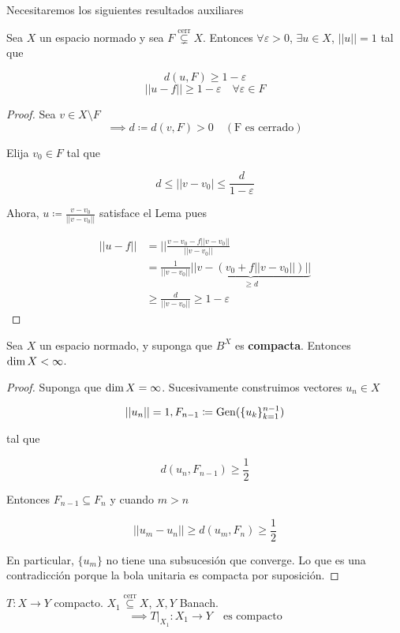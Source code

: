 Necesitaremos los siguientes resultados auxiliares

\begin{flemma}[Riesz]
   Sea $X$ un espacio normado y sea $F\overset{\text{cerr}}{\subsetneq} X$. Entonces $\forall \varepsilon>0$, $\exists u\in X$, $||u||=1$ tal que 

   \[d(u,F)\geq 1-\varepsilon\]
   \[||u-f||\geq 1-\varepsilon\quad \forall \varepsilon\in F\]
\end{flemma}

\begin{proof}
   Sea $v\in X\setminus F$
   \[\implies d\coloneqq d(v,F)>0\quad (\text{F es cerrado})\]

   Elija $v_0\in F$ tal que 

   \[d\leq ||v-v_0|\leq \frac{d}{1-\varepsilon}\]

   Ahora, $u\coloneqq \frac{v-v_0}{||v-v_0||}$ satisface el Lema pues 

   \begin{align*}
      ||u-f||&=||\frac{v-v_0-f||v-v_0||}{||v-v_0||}\\
      &=\frac{1}{||v-v_0||}\underbrace{||v-(v_0+f||v-v_0||)||}_{\geq d}\\
      &\geq \frac{d}{||v-v_0||}\geq 1-\varepsilon
   \end{align*}
\end{proof}

\begin{fcorollary}
   Sea $X$ un espacio normado, y suponga que $B^X$ es \textbf{compacta}. Entonces $\operatorname{dim} X<\infty$.
\end{fcorollary}

\begin{proof}
   Suponga que $\operatorname{dim} X=\infty$. Sucesivamente construimos vectores $u_n\in X$

   \[||u_n||=1,F_{n-1}\coloneqq \operatorname{Gen}(\{u_k\}_{k=1}^{n-1})\]

   tal que 

   \[d(u_n,F_{n-1})\geq \frac{1}{2}\]

   Entonces $F_{n-1}\subseteq F_n$ y cuando $m>n$

   \[||u_m-u_n||\geq d(u_m,F_n)\geq \frac{1}{2}\]

   En particular, $\{u_m\}$ no tiene una subsucesión que converge. Lo que es una contradicción porque la bola unitaria es compacta por suposición.
\end{proof}

\begin{fnote}
   $T:X\to Y$ compacto. $X_1\overset{\text{cerr}}{\subseteq} X$, $X,Y$ Banach.
   \[\implies T\big\rvert_{X_1}:X_1\to Y\quad\text{es compacto}\]
\end{fnote}

